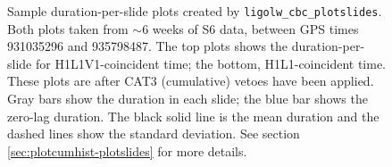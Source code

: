 \begin{figure}[p]
\center
{}
\label{fig:sample_plotslide-duration}
\caption{Sample duration-per-slide plots created by
\texttt{ligolw\_cbc\_plotslides}. Both plots taken from $\sim6$ weeks of S6
data, between GPS times 931035296 and 935798487. The top plots shows the
duration-per-slide for H1L1V1-coincident time; the bottom, H1L1-coincident
time. These plots are after CAT3 (cumulative) vetoes have been applied. Gray
bars show the duration in each slide; the blue bar shows the zero-lag duration.
The black solid line is the mean duration and the dashed lines show the
standard deviation. See section \ref{sec:plotcumhist-plotslides} for more
details.}
\end{figure}

